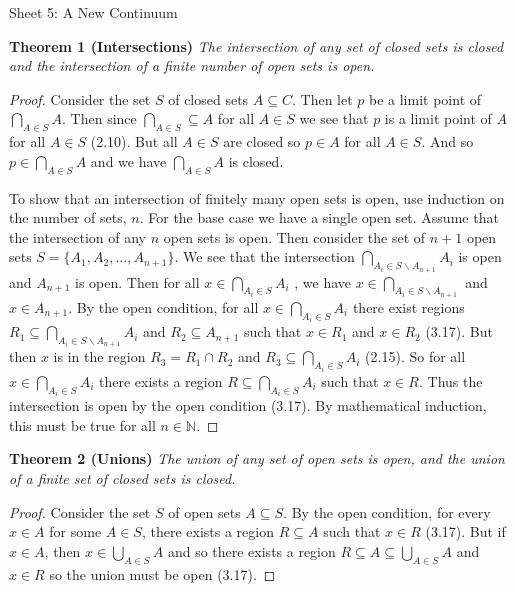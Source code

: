 \documentclass{article}
\begin{document}
\begin{flushleft}

\Large

Sheet 5: A New Continuum\newline

\normalsize

\textbf{Theorem 1 (Intersections)}
\textsl{The intersection of any set of closed sets is closed and the intersection of a finite number of open sets is open.}
\begin{proof}
Consider the set $S$ of closed sets $A \subseteq C$. Then let $p$ be a limit point of $\bigcap_{A \in S} A$. Then since $\bigcap_{A \in S} \subseteq A$ for all $A \in S$ we see that $p$ is a limit point of $A$ for all $A \in S$ (2.10). But all $A \in S$ are closed so $p \in A$ for all $A \in S$. And so $p \in \bigcap_{A \in S} A$ and we have $\bigcap_{A \in S} A$ is closed.\newline

To show that an intersection of finitely many open sets is open, use induction on the number of sets, $n$. For the base case we have a single open set. Assume that the intersection of any $n$ open sets is open. Then consider the set of $n+1$ open sets $S = \{A_1,A_2, \dots ,A_{n+1}\}$. We see that the intersection $\bigcap_{A_i \in S\backslash A_{n+1}} A_i$ is open and $A_{n+1}$ is open. Then for all $x \in \bigcap_{A_i \in S} A_i$ , we have $x \in \bigcap_{A_i \in S \backslash A_{n+1}}$ and $x \in A_{n+1}$. By the open condition, for all $x \in \bigcap_{A_i \in S} A_i$ there exist regions $R_1 \subseteq \bigcap_{A_i \in S \backslash A_{n+1}} A_i$ and $R_2 \subseteq A_{n+1}$ such that $x \in R_1$ and $x \in R_2$ (3.17). But then $x$ is in the region $R_3=R_1 \cap R_2$ and $R_3 \subseteq \bigcap_{A_i \in S} A_i$ (2.15). So for all $x \in \bigcap_{A_i \in S} A_i$  there exists a region $R \subseteq \bigcap_{A_i \in S} A_i$ such that $x \in R$. Thus the intersection is open by the open condition (3.17). By mathematical induction, this must be true for all $n \in \mathbb{N}$.
\end{proof}

\textbf{Theorem 2 (Unions)}
\textsl{The union of any set of open sets is open, and the union of a finite set of closed sets is closed.}
\begin{proof}
Consider the set $S$ of open sets $A \subseteq S$. By the open condition, for every $x \in A$ for some $A \in S$, there exists a region $R \subseteq A$ such that $x \in R$ (3.17). But if $x \in A$, then $x \in \bigcup_{A \in S} A$ and so there exists a region $R \subseteq A \subseteq \bigcup_{A \in S} A$ and $x \in R$ so the union must be open (3.17).\newline


\end{proof}
\end{flushleft}
\end{document}
